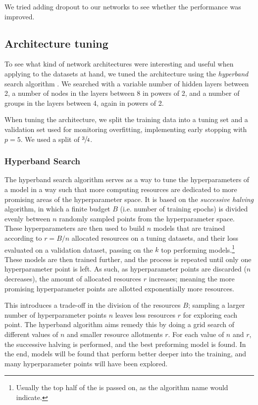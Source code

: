         We tried adding dropout to our networks to see whether the performance was improved. 


\subsection{Architecture tuning}
    To see what kind of network architectures were interesting and useful when applying to the datasets at hand, we tuned the architecture using the \textit{hyperband} search algorithm \citep{Hyperband}. We searched with a variable number of hidden layers between 2, a number of nodes in the layers between 8 in powers of 2, and a number of groups in the layers between 4, again in powers of 2.

    When tuning the architecture, we split the training data into a tuning set and a validation set used for monitoring overfitting, implementing early stopping with $p=5$. We used a split of $\sfrac{3}{4}$.

    \subsubsection{Hyperband Search}
        The hyperband search algorithm serves as a way to tune the hyperparameters of a model in a way such that more computing resources are dedicated to more promising areas of the hyperparameter space. It is based on the \textit{successive halving} algorithm, in which a finite budget $B$ (i.e. number of training epochs) is divided evenly between $n$ randomly sampled points from the hyperparameter space. These hyperparameters are then used to build $n$ models that are trained according to $r = B/n$ allocated resources on a tuning datasets, and their loss evaluated on a validation dataset, passing on the $k$ top performing models.\footnote{Usually the top half of the is passed on, as the algorithm name would indicate.} These models are then trained further, and the process is repeated until only one hyperparameter point is left. As such, as hyperparameter points are discarded ($n$ decreases), the amount of allocated resources $r$ increases; meaning the more promising hyperparameter points are allotted exponentially more resources.

        This introduces a trade-off in the division of the resources $B$; sampling a larger number of hyperparameter points $n$ leaves less resources $r$ for exploring each point. The hyperband algorithm aims remedy this by doing a grid search of different values of $n$ and smaller resource allotments $r$. For each value of $n$ and $r$, the successive halving is performed, and the best preforming model is found. In the end, models will be found that perform better deeper into the training, and many hyperparameter points will have been explored.
